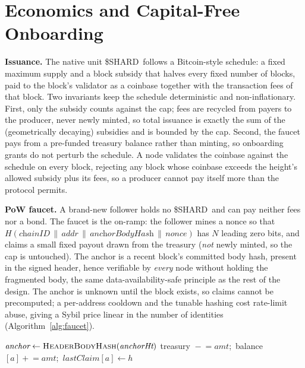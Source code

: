 \section{Economics and Capital-Free Onboarding}
\label{sec:econ}
\textbf{Issuance.} The native unit \$SHARD\ follows a Bitcoin-style schedule: a fixed maximum
supply and a block subsidy that halves every fixed number of blocks, paid to the block's validator
as a coinbase together with the transaction fees of that block. Two invariants keep the schedule
deterministic and non-inflationary. First, only the subsidy counts against the cap; fees are
recycled from payers to the producer, never newly minted, so total issuance is exactly the sum of
the (geometrically decaying) subsidies and is bounded by the cap. Second, the faucet pays from a
pre-funded treasury balance rather than minting, so onboarding grants do not perturb the schedule.
A node validates the coinbase against the schedule on every block, rejecting any block whose
coinbase exceeds the height's allowed subsidy plus its fees, so a producer cannot pay itself more
than the protocol permits.

\textbf{PoW faucet.} A brand-new follower holds no \$SHARD\ and can pay neither fees nor a bond.
The faucet is the on-ramp: the follower mines a nonce so that
$H(\textit{chainID}\,\|\,\textit{addr}\,\|\,\textit{anchorBodyHash}\,\|\,\textit{nonce})$ has $N$
leading zero bits, and claims a small fixed payout drawn from the treasury (\emph{not} newly
minted, so the cap is untouched). The anchor is a recent block's committed body
hash, present in the signed header, hence verifiable by \emph{every} node without holding the
fragmented body, the same data-availability-safe principle as the rest of the design. The anchor
is unknown until the block exists, so claims cannot be precomputed; a per-address cooldown and
the tunable hashing cost rate-limit abuse, giving a Sybil price linear in the number of
identities (Algorithm~\ref{alg:faucet}).

\begin{algorithm}[t]
\SetAlgoLined\DontPrintSemicolon
{}
$\textit{anchor} \leftarrow \textsc{HeaderBodyHash}(\textit{anchorHt})$ 
treasury $\!-\!=\textit{amt}$;\ balance$[a]\!+\!=\textit{amt}$;\ $\textit{lastClaim}[a]\leftarrow h$\;
\caption{Faucet claim verification (\textsc{Lz}: leading-zero-bit count).}
\label{alg:faucet}
\end{algorithm}
